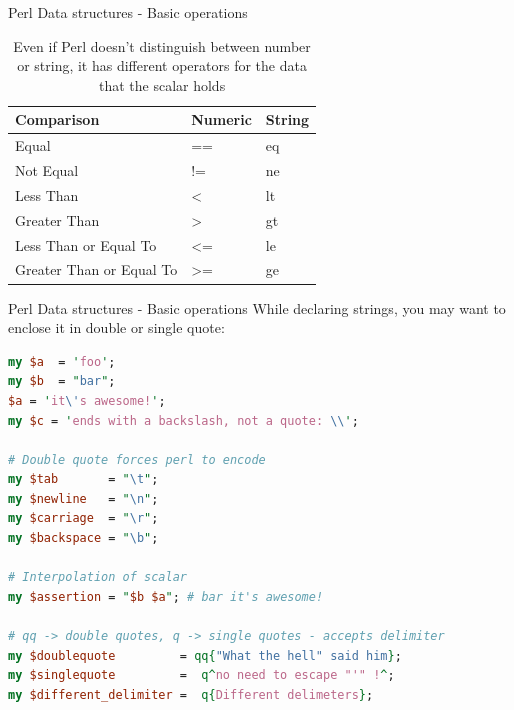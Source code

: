 \documentclass[10pt]{beamer}
\begin{document}
\begin{frame}[fragile]{Perl Data structures - Basic operations}
\begin{table}[]
\centering
\caption{Even if Perl doesn't distinguish between number or string, it has different operators for the data that the scalar holds}
\label{operators}
\begin{tabular}{lll}
\hline
{\color[HTML]{2F5361} \textbf{Comparison}} & {\color[HTML]{2F5361} \textbf{Numeric}} & {\color[HTML]{2F5361} \textbf{String}} \\ \hline
Equal                                      & ==                                      & eq                                     \\ \hline
Not Equal                                  & !=                                      & ne                                     \\ \hline
Less Than                                  & \textless                               & lt                                     \\ \hline
Greater Than                               & \textgreater                            & gt                                     \\ \hline
Less Than or Equal To                      & \textless=                              & le                                     \\ \hline
Greater Than or Equal To                   & \textgreater=                           & ge                                     \\ \hline
\end{tabular}
\end{table}
\end{frame}

\begin{frame}[fragile]{Perl Data structures - Basic operations}
While declaring strings, you may want to enclose it in double or single quote:
\begin{lstlisting}[language=perl]
my $a  = 'foo';
my $b  = "bar";
$a = 'it\'s awesome!';
my $c = 'ends with a backslash, not a quote: \\';

# Double quote forces perl to encode
my $tab       = "\t"; 
my $newline   = "\n";
my $carriage  = "\r";
my $backspace = "\b";

# Interpolation of scalar
my $assertion = "$b $a"; # bar it's awesome!

# qq -> double quotes, q -> single quotes - accepts delimiter 
my $doublequote         = qq{"What the hell" said him};
my $singlequote         =  q^no need to escape "'" !^;
my $different_delimiter =  q{Different delimeters};
\end{lstlisting}

\end{frame}
\end{document}
